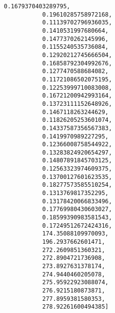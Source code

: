 \documentclass[11pt]{article}
\begin{document}
\begin{Verbatim}[commandchars=\\\{\}]
           0.1679370403289795,
           0.19610285758972168,
           0.11139702796936035,
           0.1410531997680664,
           0.1477370262145996,
           0.1155240535736084,
           0.12920212745666504,
           0.16858792304992676,
           0.1277470588684082,
           0.11721086502075195,
           0.12253999710083008,
           0.16721200942993164,
           0.13723111152648926,
           0.1467118263244629,
           0.11826205253601074,
           0.14337587356567383,
           0.1419970989227295,
           0.12366008758544922,
           0.13283824920654297,
           0.14807891845703125,
           0.12563323974609375,
           0.13700127601623535,
           0.18277573585510254,
           0.1313769817352295,
           0.13178420066833496,
           0.17769980430603027,
           0.18599390983581543,
           0.17249512672424316,
           174.35088109970093,
           196.2937662601471,
           272.2609851360321,
           272.8904721736908,
           273.8927631378174,
           274.9440460205078,
           275.95922923088074,
           276.9215180873871,
           277.8959381580353,
           278.92261600494385]
\end{Verbatim}
            
\end{document}
